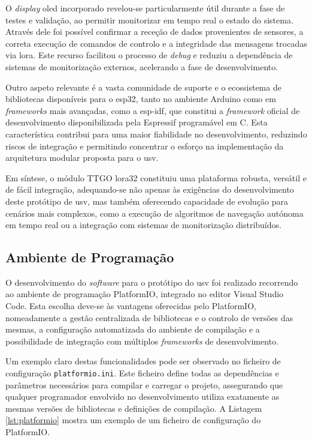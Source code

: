 O \emph{display} \gls{oled} incorporado revelou-se particularmente útil durante a fase de testes e validação, ao permitir monitorizar em tempo real o estado do sistema. Através dele foi possível confirmar a receção de dados provenientes de sensores, a correta execução de comandos de controlo e a integridade das mensagens trocadas via \gls{lora}. Este recurso facilitou o processo de \emph{debug} e reduziu a dependência de sistemas de monitorização externos, acelerando a fase de desenvolvimento.  

Outro aspeto relevante é a vasta comunidade de suporte e o ecossistema de bibliotecas disponíveis para o \gls{esp32}, tanto no ambiente Arduino como em \emph{frameworks} mais avançadas, como a \gls{esp-idf}, que constitui a \emph{framework} oficial de desenvolvimento disponibilizada pela Espressif programável em C. Esta característica contribui para uma maior fiabilidade no desenvolvimento, reduzindo riscos de integração e permitindo concentrar o esforço na implementação da arquitetura modular proposta para o \gls{usv}.

Em síntese, o módulo TTGO \gls{lora}32 constituiu uma plataforma robusta, versátil e de fácil integração, adequando-se não apenas às exigências do desenvolvimento deste protótipo de \gls{usv}, mas também oferecendo capacidade de evolução para cenários mais complexos, como a execução de algoritmos de navegação autónoma em tempo real ou a integração com sistemas de monitorização distribuídos.

\subsection{Ambiente de Programação}
\label{subsec:ambiente-programacao}

O desenvolvimento do \emph{software} para o protótipo do \gls{usv} foi realizado recorrendo ao ambiente de programação PlatformIO, integrado no editor Visual Studio Code. Esta escolha deve-se às vantagens oferecidas pelo PlatformIO, nomeadamente a gestão centralizada de bibliotecas e o controlo de versões das mesmas, a configuração automatizada do ambiente de compilação e a possibilidade de integração com múltiplos \emph{frameworks} de desenvolvimento.  

Um exemplo claro destas funcionalidades pode ser observado no ficheiro de configuração \texttt{platformio.ini}. Este ficheiro define todas as dependências e parâmetros necessários para compilar e carregar o projeto, assegurando que qualquer programador envolvido no desenvolvimento utiliza exatamente as mesmas versões de bibliotecas e definições de compilação. A Listagem \ref{lst:platformio} mostra um exemplo de um ficheiro de configuração do PlatformIO.

